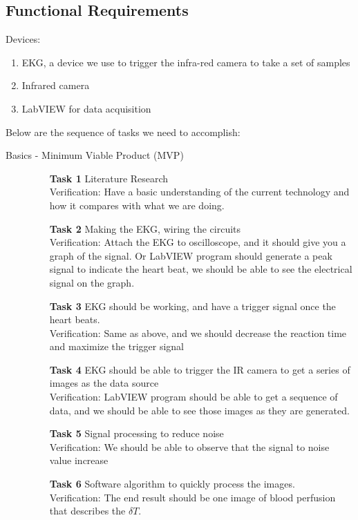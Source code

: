 \documentclass[paper=letter, fontsize=11pt]{scrartcl}
\numberwithin{equation}{section}		%
\numberwithin{figure}{section}			%
\numberwithin{table}{section}			%
\begin{document}
\subsection{Functional Requirements}
Devices: 
\begin{enumerate}{}
	\item EKG, a device we use to trigger the infra-red camera to take a set of samples
	\item Infrared camera
	\item LabVIEW for data acquisition
\end{enumerate}
Below are the sequence of tasks we need to accomplish:
\begin{description}
   \item[Basics - Minimum Viable Product (MVP)] \hspace{1cm}
   	\begin{itemize}
   	\item[\textbf{Task 1}] Literature Research\\
   	\hfill Verification: Have a basic understanding of the current technology and how it compares with what we are doing.
	\item[\textbf{Task 2}] Making the EKG, wiring the circuits\\
	\hfill Verification: Attach the EKG to oscilloscope, and it should give you a graph of the signal. Or LabVIEW program should generate a peak signal to indicate the heart beat, we should be able to see the electrical signal on the graph.
   	\item[\textbf{Task 3}]  EKG should be working, and have a trigger signal once the heart beats.\\
    	\hfill Verification: Same as above, and we should decrease the reaction time and maximize the trigger signal
   	\item[\textbf{Task 4}]  EKG should be able to trigger the IR camera to get a series of images as the data source\\
    	\hfill Verification: LabVIEW program should be able to get a sequence of data, and we should be able to see those images as they are generated.
   	\item[\textbf{Task 5}]  Signal processing to reduce noise\\
   	\hfill Verification: We should be able to observe that the signal to noise value increase
	\item[\textbf{Task 6}] Software algorithm to quickly process the images. \\
   	\hfill Verification: The end result should be one image of blood perfusion that describes the $\delta T$.   
\end{itemize}
  

\end{description}
\end{document}
